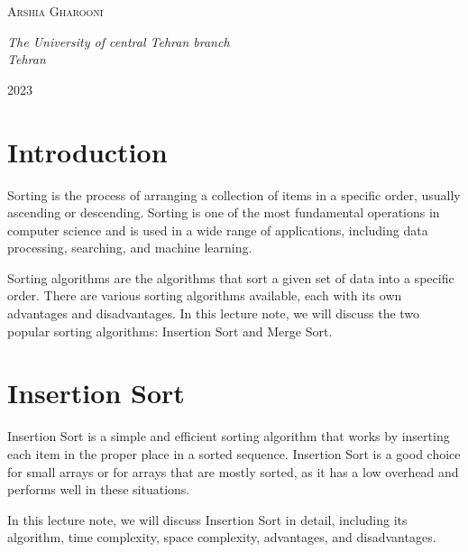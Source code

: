 \documentclass[a4paper, 11pt, oneside]{book} %
\begin{document}
\begin{titlepage}
	{\scshape\Large Arshia Gharooni \\} %
	
	\vspace{0.5\baselineskip} %
	
	\textit{The University of central Tehran branch \\ Tehran} %
	
	\vfill %
	
	
	
	
	\vspace{0.3\baselineskip} %
	
	2023 %

\end{titlepage}

\section{Introduction}

Sorting is the process of arranging a collection of items in a specific order, usually ascending or descending. Sorting is one of the most fundamental operations in computer science and is used in a wide range of applications, including data processing, searching, and machine learning.

Sorting algorithms are the algorithms that sort a given set of data into a specific order. There are various sorting algorithms available, each with its own advantages and disadvantages. In this lecture note, we will discuss the two popular sorting algorithms: Insertion Sort and Merge Sort.

\section{Insertion Sort}

Insertion Sort is a simple and efficient sorting algorithm that works by inserting each item in the proper place in a sorted sequence. Insertion Sort is a good choice for small arrays or for arrays that are mostly sorted, as it has a low overhead and performs well in these situations.

In this lecture note, we will discuss Insertion Sort in detail, including its algorithm, time complexity, space complexity, advantages, and disadvantages.
\end{document}
